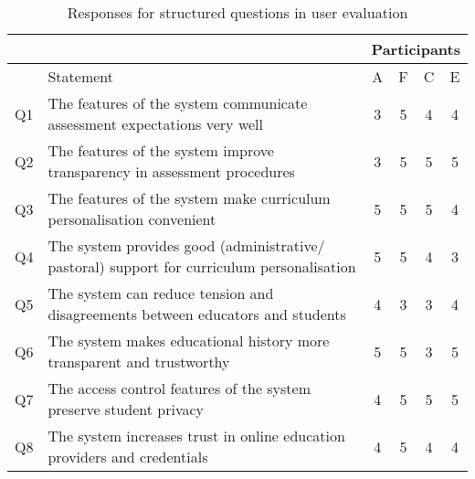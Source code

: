 \begin{table}[!ht]
	\caption{Responses for structured questions in user evaluation}
	\centering
	\label{table:structuredresp_eval}
    \begin{tabularx}{\textwidth}{|c|X|c|c|c|c|}
        \hline
        & & \multicolumn{4}{c|}{Participants}\\
		\hline
		   & Statement                                                                                  & A                        & F                      & C                        & E                        \\
		\hline
		Q1 & The features of the system communicate assessment expectations very well                   & \cellcolor{Dandelion}3   & \cellcolor{green}5     & \cellcolor{SpringGreen}4 & \cellcolor{SpringGreen}4 \\
		\hline
		Q2 & The features of the system improve transparency in assessment procedures                   & \cellcolor{Dandelion}3   & \cellcolor{green}5     & \cellcolor{green}5       & \cellcolor{green}5       \\
		\hline
		Q3 & The features of the system make curriculum personalisation convenient                      & \cellcolor{green}5       & \cellcolor{green}5     & \cellcolor{green}5       & \cellcolor{SpringGreen}4 \\
		\hline
		Q4 & The system provides good (administrative/ pastoral) support for curriculum personalisation & \cellcolor{green}5       & \cellcolor{green}5     & \cellcolor{SpringGreen}4       & \cellcolor{Dandelion}3   \\
		\hline
		Q5 & The system can reduce tension and disagreements between educators and students             & \cellcolor{SpringGreen}4 & \cellcolor{Dandelion}3 & \cellcolor{Dandelion}3   & \cellcolor{SpringGreen}4 \\
		\hline
		Q6 & The system makes educational history more transparent and trustworthy                      & \cellcolor{green}5       & \cellcolor{green}5     & \cellcolor{Dandelion}3   & \cellcolor{green}5       \\
		\hline
		Q7 & The access control features of the system preserve student privacy                         & \cellcolor{SpringGreen}4 & \cellcolor{green}5     & \cellcolor{green}5       & \cellcolor{green}5       \\
		\hline
		Q8 & The system increases trust in online education providers and credentials                   & \cellcolor{SpringGreen}4 & \cellcolor{green}5     & \cellcolor{SpringGreen}4 & \cellcolor{SpringGreen}4 \\
		\hline
	\end{tabularx}
\end{table}

